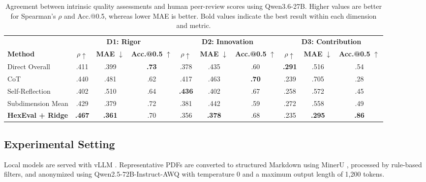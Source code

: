 \documentclass[letterpaper]{article} %
\begin{document}
\begin{table}[ht]
\centering
\setlength{\tabcolsep}{1mm}
\begin{tabular}{@{}lccccccccc@{}}
\toprule
&
\multicolumn{3}{c}{\textbf{D1: Rigor}} &
\multicolumn{3}{c}{\textbf{D2: Innovation}} &
\multicolumn{3}{c}{\textbf{D3: Contribution}} \\
\cmidrule(lr){2-4}
\cmidrule(lr){5-7}
\cmidrule(lr){8-10}
\textbf{Method}
& $\rho \uparrow$ & \textbf{MAE} $\downarrow$ & \textbf{Acc.@0.5} $\uparrow$
& $\rho \uparrow$ & \textbf{MAE} $\downarrow$ & \textbf{Acc.@0.5} $\uparrow$
& $\rho \uparrow$ & \textbf{MAE} $\downarrow$ & \textbf{Acc.@0.5} $\uparrow$ \\
\midrule
Direct Overall
& .411 & .399 & \textbf{.73}
& .378 & .435 & .60
& \textbf{.291} & .516 & .54 \\

CoT
& .440 & .481 & .62
& .417 & .463 & \textbf{.70}
& .239 & .705 & .28 \\

Self-Reflection
& .402 & .510 & .64
& \textbf{.436} & .402 & .67
& .258 & .572 & .45 \\

Subdimension Mean
& .429 & .379 & .72
& .381 & .442 & .59
& .272 & .558 & .49 \\

\textbf{HexEval + Ridge}
& \textbf{.467} & \textbf{.361} & .70
& .356 & \textbf{.378} & .68
& .235 & \textbf{.295} & \textbf{.86} \\
\bottomrule
\end{tabular}
\caption{Agreement between intrinsic quality assessments and human peer-review
scores using Qwen3.6-27B. Higher values are better for Spearman's $\rho$ and
Acc.@0.5, whereas lower MAE is better. Bold values indicate the best result
within each dimension and metric.}
\label{tab:intrinsic_results}
\end{table}

\subsection{Experimental Setting}
\label{sec:experimental_setting}

Local models are served with vLLM \cite{kwon2023efficient}. Representative PDFs are converted to structured Markdown using MinerU \cite{wang2024mineru}, processed by rule-based filters, and anonymized using Qwen2.5-72B-Instruct-AWQ \cite{yang2024qwen25} with temperature 0 and a maximum output length of 1,200 tokens.
\end{document}
